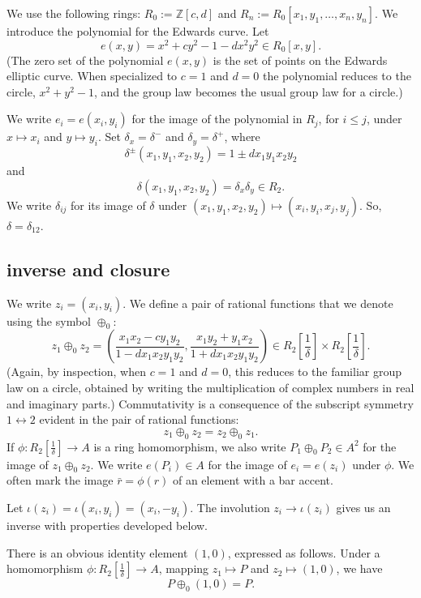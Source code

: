 \documentclass{llncs}
\newcommand{\ring}[1]{\mathbb{#1}}
\newcommand{\f}[1]{\frac{1}{#1}}
\begin{document}
We use the following rings: $R_0 := \ring{Z}[c,d]$ and $R_n :=
R_0[x_1,y_1,\ldots,x_n,y_n]$.  We introduce the polynomial for the
Edwards curve.  Let
\begin{equation}
e(x,y) = x^2 + c y^2 -1 - d x^2 y^2 \in  R_0[x,y].
\end{equation}
(The zero set of the polynomial $e(x,y)$ is the set of points on the
Edwards elliptic curve.  When specialized to $c=1$ and $d=0$ the
polynomial reduces to the circle, $x^2 + y^2 - 1$, and the group law
becomes the usual group law for a circle.)

We write $e_i = e(x_i,y_i)$ for the image of the polynomial in $R_j$,
for $i\le j$, under $x\mapsto x_i$ and $y\mapsto y_i$.  Set
$\delta_x = \delta^-$ and $\delta_y = \delta^+$, where
\[\delta^{\pm} (x_1,y_1,x_2,y_2) = 1\pm d x_1 y_1 x_2 y_2\] and
\[
\delta(x_1,y_1,x_2,y_2) = \delta_x\delta_y\in R_2.
\]
We write $\delta_{ij}$ for its image of $\delta$ under
$(x_1,y_1,x_2,y_2)\mapsto (x_i,y_i,x_j,y_j)$.  So,
$\delta=\delta_{12}$.

\subsection{inverse and closure}

We write $z_i = (x_i,y_i)$.
We define a pair of rational functions that we denote using
the symbol $\oplus_0$:
\begin{equation}\label{eqn:add}
z_1 \oplus_0 z_2 =  \left(\frac{x_1 x_2 - c y_1 y_2}{1 - d x_1 x_2 y_1 y_2},
\frac{x_1 y_2 + y_1 x_2}{1+d x_1 x_2 y_1 y_2}\right) 
\in R_2[\f{\delta}]\times R_2[\f{\delta}].
\end{equation}
(Again, by inspection, when $c=1$ and $d=0$, this reduces to the familiar group
law on a circle, obtained by writing the multiplication of complex numbers 
in real and imaginary parts.)
Commutativity is a consequence of the subscript symmetry
$1\leftrightarrow 2$ evident in the pair of rational functions:
\[
z_1 \oplus_0 z_2 = z_2\oplus_0 z_1.
\]
If $\phi:R_2[\f{\delta}]\to A$ is a ring homomorphism, we also write
$P_1\oplus_0 P_2\in A^2$ for the image of $z_1\oplus_0 z_2$.  We write
$e(P_i)\in A$ for the image of $e_i=e(z_i)$ under $\phi$.  We often
mark the image $\bar r=\phi(r)$ of an element with a bar accent.

Let $\iota(z_i) =\iota(x_i,y_i) = (x_i,-y_i)$.  The involution $z_i\to \iota(z_i)$ gives us an inverse
with properties developed below.

There is an obvious identity element $(1,0)$, expressed as follows.
Under a homomorphism $\phi:R_2[\f{\delta}]\to A$, mapping $z_1\mapsto
P$ and $z_2\mapsto (1,0)$, we have
\begin{equation}
P\oplus_0(1,0) = P.
\end{equation}
\end{document}

